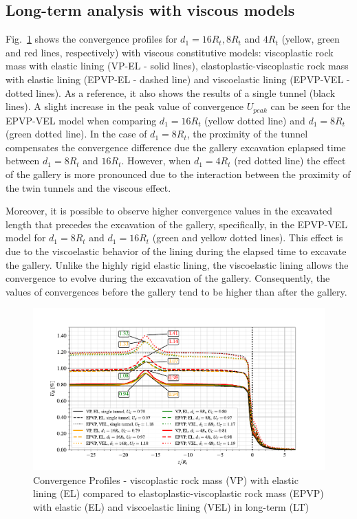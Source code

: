 \documentclass[a4paper,fleqn]{cas-sc}
\begin{document}
\subsection{Long-term analysis with viscous models}\label{}

Fig.~\ref{VP-EL-EPVP-VEL-WG-LT} shows the convergence profiles for $d_1 = 16R_t, 8R_t$ and $4R_t$ (yellow, green and red lines, respectively) with viscous constitutive models: viscoplastic rock mass with elastic lining (VP-EL - solid lines), elastoplastic-viscoplastic rock mass with elastic lining (EPVP-EL - dashed line) and viscoelastic lining (EPVP-VEL - dotted lines). As a reference, it also shows the results of a single tunnel (black lines). A slight increase in the peak value of convergence $U_{peak}$ can be seen for the EPVP-VEL model when comparing $d_1 = 16R_t$ (yellow dotted line) and $d_1 = 8R_t$ (green dotted line). In the case of $d_1 = 8R_t$, the proximity of the tunnel compensates the convergence difference due the gallery excavation eplapsed time between $d_1 = 8R_t$ and $16 R_t$. However, when $d_1 = 4R_t$ (red  dotted line) the effect of the gallery is more pronounced due to the interaction between the proximity of the twin tunnels and the viscous effect. 

Moreover, it is possible to observe higher convergence values in the excavated length that precedes the excavation of the gallery, specifically, in the EPVP-VEL model for $d_1 = 8R_t$ and $d_1 = 16R_t$ (green and yellow dotted lines). This effect is due to the viscoelastic behavior of the lining during the elapsed time to excavate the gallery. Unlike the highly rigid elastic lining, the viscoelastic lining allows the convergence to evolve during the excavation of the gallery. Consequently, the values of convergences before the gallery tend to be higher than after the gallery.

\begin{figure}[h!]
	\centering
	\includegraphics[scale=0.9]{Convergence Profiles - VP_EPVP_EL_VEL_WG_LT_anotate.pdf}
	\caption{Convergence Profiles - viscoplastic rock mass (VP) with elastic lining (EL) compared to elastoplastic-viscoplastic rock mass (EPVP) with elastic (EL) and viscoelastic lining (VEL) in long-term (LT)}
	\label{VP-EL-EPVP-VEL-WG-LT}
\end{figure}
\FloatBarrier
\end{document}
